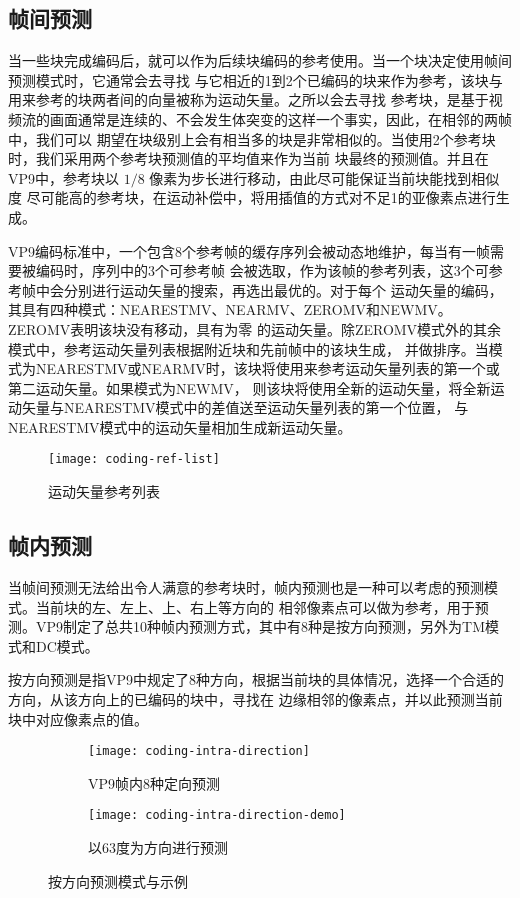 \subsection{帧间预测}
\label{subsec:inter}

当一些块完成编码后，就可以作为后续块编码的参考使用。当一个块决定使用帧间预测模式时，它通常会去寻找
与它相近的1到2个已编码的块来作为参考，该块与用来参考的块两者间的向量被称为运动矢量。之所以会去寻找
参考块，是基于视频流的画面通常是连续的、不会发生体突变的这样一个事实，因此，在相邻的两帧中，我们可以
期望在块级别上会有相当多的块是非常相似的。当使用2个参考块时，我们采用两个参考块预测值的平均值来作为当前
块最终的预测值。并且在VP9中，参考块以 $1/8$ 像素为步长进行移动，由此尽可能保证当前块能找到相似度
尽可能高的参考块，在运动补偿中，将用插值的方式对不足1的亚像素点进行生成。

VP9编码标准中，一个包含8个参考帧的缓存序列会被动态地维护，每当有一帧需要被编码时，序列中的3个可参考帧
会被选取，作为该帧的参考列表，这3个可参考帧中会分别进行运动矢量的搜索，再选出最优的。对于每个
运动矢量的编码，其具有四种模式：NEARESTMV、NEARMV、ZEROMV和NEWMV。ZEROMV表明该块没有移动，具有为零
的运动矢量。除ZEROMV模式外的其余模式中，参考运动矢量列表根据附近块和先前帧中的该块生成，
并做排序。当模式为NEARESTMV或NEARMV时，该块将使用来参考运动矢量列表的第一个或第二运动矢量。如果模式为NEWMV，
则该块将使用全新的运动矢量，将全新运动矢量与NEARESTMV模式中的差值送至运动矢量列表的第一个位置，
与NEARESTMV模式中的运动矢量相加生成新运动矢量。

\begin{figure}[H] %
  \centering
  \texttt{[image: coding-ref-list]}
  \caption{运动矢量参考列表}
  \label{fig:coding-ref-list}
\end{figure}

\subsection{帧内预测}
\label{subsec:intra}

当帧间预测无法给出令人满意的参考块时，帧内预测也是一种可以考虑的预测模式。当前块的左、左上、上、右上等方向的
相邻像素点可以做为参考，用于预测。VP9制定了总共10种帧内预测方式，其中有8种是按方向预测，另外为TM模式和DC模式。

按方向预测是指VP9中规定了8种方向，根据当前块的具体情况，选择一个合适的方向，从该方向上的已编码的块中，寻找在
边缘相邻的像素点，并以此预测当前块中对应像素点的值。

\begin{figure}[H]
  \centering%
  \begin{subfigure}{0.43\textwidth}
    \centering
    \texttt{[image: coding-intra-direction]}
    \caption{VP9帧内8种定向预测}
  \end{subfigure}%
  \hspace{2em}%
  \begin{subfigure}{0.43\textwidth}
    \centering
    \texttt{[image: coding-intra-direction-demo]}
    \caption{以63度为方向进行预测}
  \end{subfigure}
  \caption{按方向预测模式与示例}
\end{figure}

